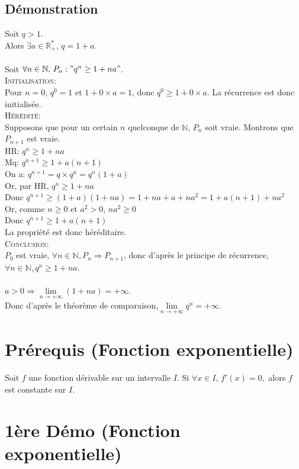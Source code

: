 \documentclass[12px]{article}
\begin{document}
	\subsection{Démonstration}
	Soit $q>1$.\\
	Alors $\exists a\in\mathbb{R}_+^*, \,q=1+a$.\\
	\\
	Soit $\forall n\in\mathbb{N}, \,P_n:"q^n\geq 1+na"$.\\
	\textsc{Initialisation:}\\
	Pour $n=0$, $q^0=1$ et $1+0\times a=1$, donc $q^0\geq 1+0\times a$. La récurrence est donc initialisée.\\
	\textsc{Hérédité:}\\
	Supposons que pour un certain $n$ quelconque de $\mathbb{N}$, $P_n$ soit vraie. Montrons que $P_{n+1}$ est vraie.\\
	HR: $q^n \geq 1+na$\\
	Mq: $q^{n+1} \geq 1+a(n+1)$\\
	On a: $q^{n+1}=q\times q^n =q^n(1+a)$\\
	Or, par HR, $q^n \geq 1+na$\\
	Donc $q^{n+1} \geq (1+a)(1+na) = 1+na+a+na^2 = 1+a(n+1)+na^2$\\
	Or, comme $n\geq 0$ et $a^2>0$, $na^2\geq 0$\\
	Donc $q^{n+1}\geq 1+a(n+1)$\\
	La propriété est donc héréditaire.\\
	\textsc{Conclusion:}\\
	$P_0$ est vraie, $\forall n\in\mathbb{N},P_n\Rightarrow P_{n+1}$, donc d'après le principe de récurrence, $\forall n\in\mathbb{N}, q^n\geq 1+na$.\\
	\\
	$a>0 \Rightarrow \lim\limits_{n\rightarrow +\infty}(1+na)= +\infty$.\\
	Donc d'après le théorème de comparaison,$ \lim\limits_{n\rightarrow +\infty}q^n=+\infty$.
	
	\section{Prérequis (Fonction exponentielle)}
	Soit $f$ une fonction dérivable sur un intervalle $I$.
	Si $\forall x\in I, \,f'(x)=0,$ alors $f$ est constante sur $I$.
	
	\section{1ère Démo (Fonction exponentielle)}
		
\end{document}
